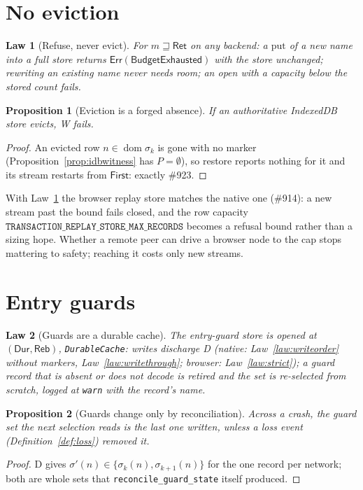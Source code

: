 \documentclass[journal]{IEEEtran}
\newtheorem{law}{Law}
\newtheorem{proposition}{Proposition}
\newcommand{\dom}{\operatorname{dom}}
\newcommand{\Err}{\mathsf{Err}}
\newcommand{\Exhausted}{\mathsf{BudgetExhausted}}
\newcommand{\Durable}{\mathsf{Dur}}
\newcommand{\Rebuild}{\mathsf{Reb}}
\newcommand{\Retained}{\mathsf{Ret}}
\newcommand{\issue}[1]{\#{#1}}
\begin{document}
\section{No eviction}\label{sec:noevict}

\begin{law}[Refuse, never evict]\label{law:refuse}
For $m\sqsupseteq\Retained$ on any backend: a $\mathrm{put}$ of a new name into a full store
returns $\Err(\Exhausted)$ with the store unchanged; rewriting an existing name never needs
room; an open with a capacity below the stored count fails.
\end{law}

\begin{proposition}[Eviction is a forged absence]\label{prop:evict}
If an authoritative IndexedDB store evicts, W fails.
\end{proposition}
\begin{proof}
An evicted row $n\in\dom\sigma_k$ is gone with no marker (Proposition~\ref{prop:idbwitness}
has $P=\emptyset$), so restore reports nothing for it and its stream restarts from
$\mathsf{First}$: exactly \issue{923}.
\end{proof}

With Law~\ref{law:refuse} the browser replay store matches the native one (\#914): a new
stream past the bound fails closed, and the row capacity
$\mathtt{TRANSACTION\_REPLAY\_STORE\_MAX\_RECORDS}$ becomes a refusal bound rather than a
sizing hope.  Whether a remote peer can drive a browser node to the cap stops mattering to
safety; reaching it costs only new streams.

\section{Entry guards}\label{sec:guards}

\begin{law}[Guards are a durable cache]\label{law:guards}
The entry-guard store is opened at $(\Durable,\Rebuild)$, \texttt{DurableCache}: writes
discharge D (native: Law~\ref{law:writeorder} without markers, Law~\ref{law:writethrough};
browser: Law~\ref{law:strict}); a guard record that is absent or does not decode is retired
and the set is re-selected from scratch, logged at \texttt{warn} with the record's name.
\end{law}

\begin{proposition}[Guards change only by reconciliation]\label{prop:guards}
Across a crash, the guard set the next selection reads is the last one written, unless a
loss event (Definition~\ref{def:loss}) removed it.
\end{proposition}
\begin{proof}
D gives $\sigma'(n)\in\{\sigma_k(n),\sigma_{k+1}(n)\}$ for the one record per network; both
are whole sets that \texttt{reconcile\_guard\_state} itself produced.
\end{proof}
\end{document}
